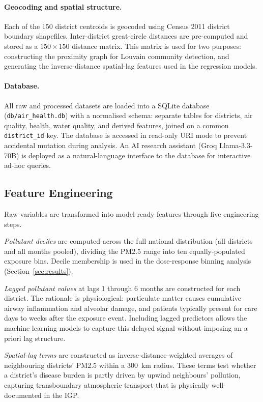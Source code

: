 \documentclass{article}
\begin{document}
\paragraph{Geocoding and spatial structure.}
Each of the 150 district centroids is geocoded using Census 2011 district boundary
shapefiles. Inter-district great-circle distances are pre-computed and stored as a
$150 \times 150$ distance matrix. This matrix is used for two purposes: constructing the
proximity graph for Louvain community detection, and generating the inverse-distance
spatial-lag features used in the regression models.

\paragraph{Database.}
All raw and processed datasets are loaded into a SQLite database
(\texttt{db/air\_health.db}) with a normalised schema: separate tables for districts,
air quality, health, water quality, and derived features, joined on a common
\texttt{district\_id} key. The database is accessed in read-only URI mode to prevent
accidental mutation during analysis. An AI research assistant (Groq Llama-3.3-70B) is
deployed as a natural-language interface to the database for interactive ad-hoc queries.

\subsection{Feature Engineering}

Raw variables are transformed into model-ready features through five engineering steps.

\emph{Pollutant deciles} are computed across the full national distribution (all districts
and all months pooled), dividing the PM2.5 range into ten equally-populated exposure bins.
Decile membership is used in the dose-response binning analysis (Section~\ref{sec:results}).

\emph{Lagged pollutant values} at lags 1 through 6 months are constructed for each
district. The rationale is physiological: particulate matter causes cumulative airway
inflammation and alveolar damage, and patients typically present for care days to weeks
after the exposure event. Including lagged predictors allows the machine learning models to
capture this delayed signal without imposing an a priori lag structure.

\emph{Spatial-lag terms} are constructed as inverse-distance-weighted averages of
neighbouring districts' PM2.5 within a 300~km radius. These terms test whether a
district's disease burden is partly driven by upwind neighbours' pollution, capturing
transboundary atmospheric transport that is physically well-documented in the IGP.
\end{document}
